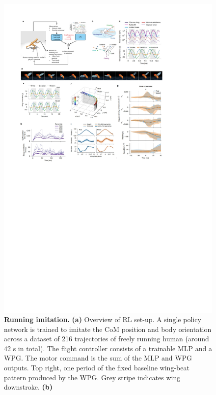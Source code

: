 \documentclass[sn-mathphys-num]{sn-jnl}%
\theoremstyle{thmstyleone}%
\theoremstyle{thmstyletwo}%
\theoremstyle{thmstylethree}%
\begin{document}
\begin{figure}[!htb]
	\centering
	\includegraphics[width=1.0\textwidth]{fig/fig_3.pdf}
	\caption{
		\textbf{Running imitation.
		}
		\textbf{(a)} Overview of RL set-up. 
		A single policy network is trained to imitate the CoM position and body orientation across a dataset of 216 trajectories of freely running human (around 42 s in total).
		The flight controller consists of a trainable MLP and a WPG. 
		The motor command is the sum of the MLP and WPG outputs. 
		Top right, one period of the fixed baseline wing-beat pattern produced by the WPG. 
		Grey stripe indicates wing downstroke.
		\textbf{(b)} %
}
\end{figure}
\end{document}
